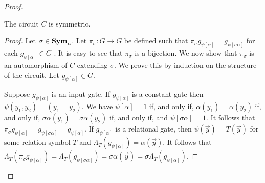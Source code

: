 \documentclass[../main/thesis.tex]{subfiles}
\begin{document}
\begin{proof}
\begin{claim}
  The circuit $C$ is symmetric.
\end{claim}
\begin{proof}
  Let $\sigma \in \text{\textbf{Sym}}_n$. Let $\pi_\sigma : G \rightarrow G$ be defined such
  that $\pi_{\sigma} g_{\psi [\alpha]} = g_{\psi[\sigma \alpha]}$ for each
  $g_{\psi[\alpha]} \in G$ . It is easy to see that $\pi_\sigma$ is a bijection.
  We now show that $\pi_{\sigma}$ is an automorphism of $C$ extending $\sigma$.
  We prove this by induction on the structure of the circuit. Let
  $g_{\psi[\alpha]} \in G$.

  Suppose $g_{\psi[\alpha]}$ is an input gate. If $g_{\psi[\alpha]}$ is a
  constant gate then $\psi (y_1, y_2) = (y_1 = y_2)$. We have $\psi[\alpha] = 1$
  if, and only if, $\alpha(y_1) = \alpha(y_2)$ if, and only if, $\sigma \alpha
  (y_1) = \sigma \alpha(y_2)$ if, and only if, and $\psi[\sigma \alpha] = 1$. It
  follows that $\pi_\sigma g_{\psi[\alpha]} = g_{\psi[\sigma \alpha]} =
  g_{\psi[\alpha]}$. If $g_{\psi[\alpha]}$ is a relational gate, then $\psi
  (\vec{y}) = T(\vec{y})$ for some relation symbol $T$ and $\Lambda_T
  (g_{\psi[\alpha]}) = \alpha (\vec{y})$. It follows that $\Lambda_T
  (\pi_{\sigma} g_{\psi[\alpha]}) = \Lambda_T( g_{\psi[\sigma \alpha]}) = \sigma
  \alpha (\vec{y}) = \sigma \Lambda_T (g_{\psi[\alpha]})$.
  

\end{proof}
\end{proof}
\end{document}

